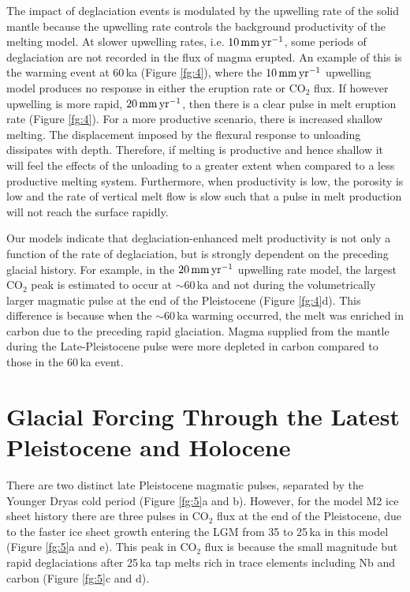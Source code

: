 \documentclass[draft,linenumbers]{agujournal2018}
\begin{document}
The impact of deglaciation events is modulated by the upwelling rate of the solid mantle because the upwelling rate controls the background productivity of the melting model. At slower upwelling rates, i.e. $10\rm\,mm\,yr^{-1}$, some periods of deglaciation are not recorded in the flux of magma erupted. An example of this is the warming event at 60\,ka (Figure \ref{fg:4}), where the $10\rm\,mm\,yr^{-1}$ upwelling model produces no response in either the eruption rate or CO$_{2}$ flux. If however upwelling is more rapid, $20\rm\,mm\,yr^{-1}$, then there is a clear pulse in melt eruption rate (Figure \ref{fg:4}). For a more productive scenario, there is increased shallow melting. The displacement imposed by the flexural response to unloading dissipates with depth. Therefore, if melting is productive and hence shallow it will feel the effects of the unloading to a greater extent when compared to a less productive melting system. Furthermore, when productivity is low, the porosity is low and the rate of vertical melt flow is slow such that a pulse in melt production will not reach the surface rapidly.

Our models indicate that deglaciation-enhanced melt productivity is not only a function of the rate of deglaciation, but is strongly dependent on the preceding glacial history. For example, in the $20\rm\,mm\,yr^{-1}$ upwelling rate model, the largest CO$_{2}$ peak is estimated to occur at $\sim$60\,ka and not during the volumetrically larger magmatic pulse at the end of the Pleistocene (Figure \ref{fg:4}d). This difference is because when the $\sim$60\,ka warming occurred, the melt was enriched in carbon due to the preceding rapid glaciation. Magma supplied from the mantle during the Late-Pleistocene pulse were more depleted in carbon compared to those in the 60\,ka event.

\section{Glacial Forcing Through the Latest Pleistocene and Holocene}

There are two distinct late Pleistocene magmatic pulses, separated by the Younger Dryas cold period (Figure \ref{fg:5}a and b). However, for the model M2 ice sheet history there are three pulses in CO$_{2}$ flux at the end of the Pleistocene, due to the faster ice sheet growth entering the LGM from 35 to 25\,ka in this model (Figure \ref{fg:5}a and e). This peak in CO$_{2}$ flux is because the small magnitude but rapid deglaciations after 25\,ka tap melts rich in trace elements including Nb and carbon (Figure \ref{fg:5}c and d).
\end{document}

